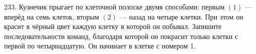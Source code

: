 233. Кузнечик прыгает по клеточной полоске двумя способами: первым $(1)$ --- вперёд на семь клеток, вторым $(2)$ --- назад на четыре клетки. При этом он красит в чёрный цвет каждую клетку в которой он побывал. Запишите последовательности команд, благодаря которой он покрасит только клетки с первой по четырнадцатую. Он начинает в клетке с номером 1.\\
